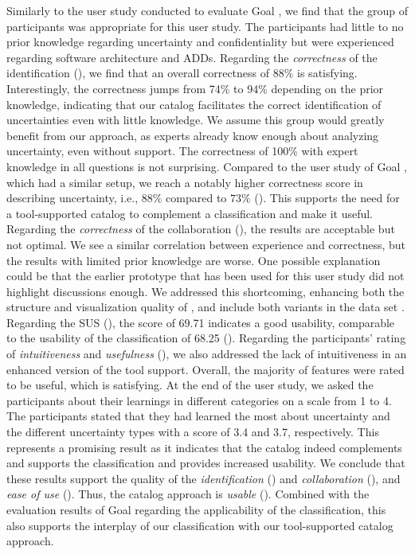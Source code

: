 Similarly to the user study conducted to evaluate Goal , we find that the group of participants was appropriate for this user study.
The participants had little to no prior knowledge regarding uncertainty and confidentiality but were experienced regarding software architecture and \acp{ADD}.
Regarding the \emph{correctness} of the identification (), we find that an overall correctness of $88\%$ is satisfying.
Interestingly, the correctness jumps from 74\% to 94\% depending on the prior knowledge, indicating that our catalog facilitates the correct identification of uncertainties even with little knowledge.
We assume this group would greatly benefit from our approach, as experts already know enough about analyzing uncertainty, even without support.
The correctness of 100\% with expert knowledge in all questions is not surprising.
Compared to the user study of Goal , which had a similar setup, we reach a notably higher correctness score in describing uncertainty, i.e., $88\%$ compared to $73\%$ ().
This supports the need for a tool-supported catalog to complement a classification and make it useful.
Regarding the \emph{correctness} of the collaboration (), the results are acceptable but not optimal.
We see a similar correlation between experience and correctness, but the results with limited prior knowledge are worse.
One possible explanation could be that the earlier prototype that has been used for this user study did not highlight discussions enough.
We addressed this shortcoming, enhancing both the structure and visualization quality of \arcen, and include both variants in the data set \cite{dataset}.
Regarding the \ac{SUS} (), the score of 69.71 indicates a good usability, comparable to the usability of the classification of 68.25 ().
Regarding the participants' rating of \emph{intuitiveness} and \emph{usefulness} (), we also addressed the lack of intuitiveness in an enhanced version of the tool support.
Overall, the majority of features were rated to be useful, which is satisfying.
At the end of the user study, we asked the participants about their learnings in different categories on a scale from 1 to 4.
The participants stated that they had learned the most about uncertainty and the different uncertainty types with a score of 3.4 and 3.7, respectively.
This represents a promising result as it indicates that the catalog indeed complements and supports the classification and provides increased usability.
We conclude that these results support the quality of the \emph{identification} () and \emph{collaboration} (), and \emph{ease of use} ().
Thus, the catalog approach is \emph{usable} ().
Combined with the evaluation results of Goal  regarding the applicability of the classification, this also supports the interplay of our classification with our tool-supported catalog approach.


